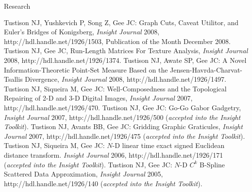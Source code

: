 \documentclass{resume}
\def\-{\discretionary{}{}{}}
\begin{document}
\begin{category}{Research}
\begin{itemize}
   \citemnobullet  Tustison NJ,  Yushkevich P, Song Z, Gee JC:  Graph Cuts, Caveat Utilitor, and Euler's Bridges of Konigsberg,   {\em Insight Journal} 2008, http:\-//hdl\-.\-handle\-.\-net/1926/1503, Publication of the Month December 2008.  
   \citemnobullet  Tustison NJ,  Gee JC,  Run-Length Matrices For Texture Analysis,   {\em Insight Journal} 2008, http:\-//hdl\-.\-handle\-.\-net/1926/1374.  
   \citemnobullet  Tustison NJ,  Awate SP, Gee JC:  A Novel Information-Theoretic Point-Set Measure Based on the Jensen-Havrda-Charvat-Tsallis Divergence,   {\em Insight Journal} 2008, http:\-//hdl\-.\-handle\-.\-net/1926/1497.  
   \citemnobullet  Tustison NJ,  Siqueira M, Gee JC: Well-Composedness and the Topological Repairing of 2-D and 3-D Digital Images,   {\em Insight Journal} 2007, http:\-//hdl\-.\-handle\-.\-net/1926/470.  
   \citemnobullet  Tustison NJ,  Gee JC:  Go-Go Gabor Gadgetry,   {\em Insight Journal} 2007, http:\-//hdl\-.\-handle\-.\-net/1926/500 ({\em accepted into the Insight Toolkit}).  
   \citemnobullet   Tustison NJ,  Avants BB, Gee JC: Gridding Graphic Graticules,   {\em Insight Journal} 2007, http:\-//hdl\-.\-handle\-.\-net/1926/475  ({\em accepted into the Insight Toolkit}). 
   \citemnobullet Tustison NJ, Siqueira M, Gee JC: $N$-D linear time exact signed Euclidean distance transform. {\em Insight Journal} 2006, http:\-//hdl\-.\-handle\-.\-net/1926/171 ({\em accepted into the Insight Toolkit}).
   \citemnobullet  Tustison NJ,  Gee JC:  $N$-D $C^k$ B-Spline Scattered Data Approximation,   {\em Insight Journal} 2005, 
   http:\-//hdl\-.\-handle\-.\-net/1926/140 
   ({\em accepted into the Insight Toolkit}).  
   \end{itemize}
 

\end{category}   


\end{document}
